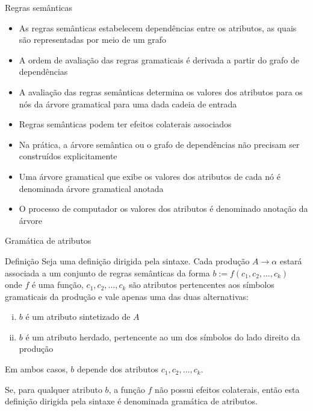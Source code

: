 \begin{frame}[fragile]{Regras semânticas}

    \begin{itemize}
        \item As regras semânticas estabelecem dependências entre os atributos, as quais são representadas por meio de um grafo

        \item A ordem de avaliação das regras gramaticais é derivada a partir do grafo de dependências

        \item A avaliação das regras semânticas determina os valores dos atributos para os nós da árvore gramatical para uma dada 
            cadeia de entrada

        \item Regras semânticas podem ter efeitos colaterais associados

        \item Na prática, a árvore semântica ou o grafo de dependências não precisam ser construídos explicitamente

        \item Uma árvore gramatical que exibe os valores dos atributos de cada nó é denominada árvore gramatical anotada

        \item O processo de computador os valores dos atributos é denominado anotação da árvore
    \end{itemize}

\end{frame}

\begin{frame}[fragile]{Gramática de atributos}

    \begin{block}{Definição}
        Seja uma definição dirigida pela sintaxe. Cada produção $A\to \alpha$ estará associada a um conjunto de regras semânticas da
        forma $b := f(c_1, c_2, \ldots, c_k)$ onde $f$ é uma função, $c_1, c_2, \ldots, c_k$ são atributos pertencentes aos símbolos
        gramaticais da produção e vale apenas uma das duas alternativas:
        \begin{enumerate}[(i)]
            \item $b$ é um atributo sintetizado de $A$
            \item $b$ é um atributo herdado, pertencente ao um dos símbolos do lado direito da produção
        \end{enumerate}
        Em ambos casos, $b$ depende dos atributos $c_1, c_2, \ldots, c_k$.

        \vspace{0.1in}
        Se, para qualquer atributo $b$, a função $f$ não possui efeitos colaterais, então esta definição dirigida pela sintaxe é 
        denominada gramática de atributos.
    \end{block}

\end{frame}

